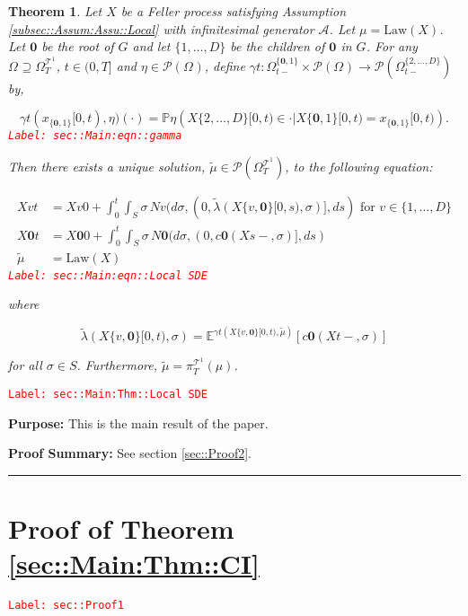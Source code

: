 \documentclass[12pt]{article}
\newcommand{\mb}{\mathbb}
\newcommand{\mc}{\mathcal}
\newcommand{\ra}{\rightarrow}
\newcommand{\te}{\text}
\newcommand{\tr}{\textcolor{red}}
\newcommand{\labe}[1]{\tr{\texttt{Label: #1}}}
\newcommand{\purpose}{\textbf{Purpose: }}
\newcommand{\pfsum}{\textbf{Proof Summary: }}
\newcommand{\lin}{\rule{\linewidth}{0.4 pt}}
\newcommand{\pr}{\mb{P}}							%
\newcommand{\exmu}[2]{\mb{E}^{#1}\left[#2\right]}	%
\newcommand{\pmsr}{\mc{P}}							%
\renewcommand{\root}{\mathbf{0}}				%
\renewcommand{\v}{v}							%
\renewcommand{\S}{S}							%
\newcommand{\s}{\sigma}							%
\newcommand{\T}{T}								%
\newcommand{\x}{x}								%
\renewcommand{\t}{t}							%
\newcommand{\sset}{\Omega}						%
\newcommand{\proj}{\pi}							%
\renewcommand{\tt}{s}							%
\newcommand{\X}{X}								%
\newcommand{\IG}{\mc{A}}						%
\newcommand{\IGr}{c}							%
\newcommand{\vsi}[1]{^{#1}}						%
\newcommand{\cind}[1]{_{#1}}					%
\newcommand{\tip}[1]{#1}						%
\newcommand{\ts}[1]{_{#1}}						%
\newcommand{\degr}{D}							%
\newcommand{\tree}{\mc{T}}						%
\newcommand{\sln}[1]{^{#1}}						%
\newcommand{\poiss}{N}							%
\newcommand{\alt}[1]{\widetilde{#1}}			%
\newcommand{\m}{\mu}							%
\newcommand{\mmm}{\eta}							%
\newcommand{\cm}{\gamma}						%
\newcommand{\law}{\te{Law}}						%
\newcommand{\crate}{\alt{\lambda}}				%
\newtheorem{thms}{Theorem}[section]
\begin{document}
\begin{thms}
Let \(\X{}{}\) be a Feller process satisfying Assumption \ref{subsec::Assum:Assu::Local} with infinitesimal generator \(\IG\). Let \(\m{}{}{} = \law(\X{}{})\). Let \(\root\) be the root of \(G\) and let \(\{1,\dots,\degr\}\) be the children of \(\root\) in \(G\). For any \(\sset\vsi{}\ts{} \supseteq\sset\vsi{\tree\sln{1}}\ts{\T}\), \(\t\in (0,\T]\) and \(\mmm{}{}{} \in \pmsr(\sset\vsi{}\ts{})\), define \(\cm{\t}:\sset\vsi{\{\root,1\}}\ts{\t-}\times \pmsr(\sset\vsi{}\ts{}) \ra \pmsr(\sset\vsi{\{2,\dots,\degr\}}\ts{\t-})\) by,

\begin{equation}
\cm{\t}(\x\cind{\{\root,1\}}\tip{[0,\t)},\mmm{}{}{})(\cdot) = \pr{\mmm{}{}{}}\left(\X{\{2,\dots,\degr\}}{[0,\t)} \in \cdot|\X{\{\root,1\}}{[0,\t)} = \x\cind{\{\root,1\}}\tip{[0,\t)}\right).
\label{sec::Main:eqn::gamma}
\end{equation}
\labe{sec::Main:eqn::gamma}

Then there exists a unique solution, \(\alt{\m{}{}{}} \in \pmsr(\sset\vsi{\tree\sln{1}}\ts{\T})\), to the following equation:

\begin{align}
\X{\v}{\t} &= \X{\v}{0} + \int_0^\t\int_\S \s\,\poiss{\v}(d\s,(0,\crate{}(\X{\{\v,\root\}}{[0,\tt)},\s)],d\tt) \te{ for } \v \in \{1,\dots,\degr\}\nonumber\\
\X{\root}{\t} &= \X{\root}{0} + \int_0^\t\int_\S \s\,\poiss{\root}(d\s,(0,\IGr{\root}(\X{}{\tt-},\s)],d\tt)\nonumber\\
\alt{\m{}{}{}} &= \law(\X{}{})
\label{sec::Main:eqn::Local SDE}
\end{align}
\labe{sec::Main:eqn::Local SDE}

where

\[\crate{}(\X{\{\v,\root\}}{[0,\t)},\s) = \exmu{\cm{\t}(\X{\{\v,\root\}}{[0,\t)},\alt{\m{}{}{}})}{\IGr{\root}(\X{}{\t-},\s)}\]

for all \(\s\in \S\). Furthermore, \(\alt{\m{}{}{}} = \proj\vsi{\tree\sln{1}}\ts{\T}(\m{}{}{})\).
\label{sec::Main:Thm::Local SDE}
\end{thms}
\labe{sec::Main:Thm::Local SDE}

\purpose This is the main result of the paper. 

\pfsum See section \ref{sec::Proof2}.

\lin

\section{Proof of Theorem \ref{sec::Main:Thm::CI}}
\label{sec::Proof1}\labe{sec::Proof1}
\end{document}

